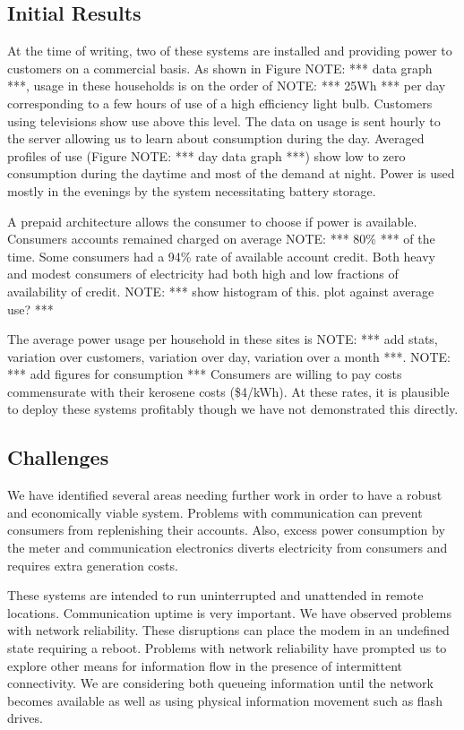 \documentclass[conference]{IEEEtran}
\newcommand{\note}[1]{{\color{red} NOTE: *** #1 ***}}
\begin{document}
\subsection{Initial Results}
At the time of writing, two of these systems are installed and providing
power to customers on a commercial basis.  
As shown in Figure \note{data graph}, usage in these households is on 
the order of \note{25Wh} per day corresponding to a few hours of use of
a high efficiency light bulb.  Customers using televisions show use above
this level.  The data on usage is sent hourly to the server allowing us
to learn about consumption during the day.  Averaged profiles of use 
(Figure \note{day data graph}) show low to zero consumption during the 
daytime and most of the demand at night.  Power is used mostly in
the evenings by the system necessitating battery storage.  

A prepaid architecture allows the consumer to choose if power is available.
Consumers accounts remained charged on average \note{80\%} of the time.  
Some consumers had a 94\% rate of available account credit.  Both heavy and
modest consumers of electricity had both high and low fractions of availability
of credit.  \note{show histogram of this.  plot against average use?}
 
The average power usage per
household in these sites is \note{add stats, variation over customers, 
variation over day, variation over a month}.  \note{add figures
for consumption}  Consumers are willing to pay costs commensurate with their 
kerosene costs (\$4/kWh).  At these rates, it is plausible to deploy these
systems profitably though we have not demonstrated this directly.

\subsection{Challenges}
We have identified several areas needing further work in order to have 
a robust and economically viable system.  Problems with communication
can prevent consumers from replenishing their accounts.  Also, excess
power consumption by the meter and communication electronics diverts 
electricity from consumers and requires extra generation costs.

These systems are intended to run uninterrupted and unattended in 
remote locations.  Communication uptime is very important.  We have 
observed problems with network reliability.  These disruptions can
place the modem in an undefined state requiring a reboot.  
Problems with network reliability have prompted us to explore other 
means for information flow in the presence of intermittent connectivity.
We are considering both queueing information until the network becomes
available as well as using physical information movement such as flash
drives.
\end{document}
